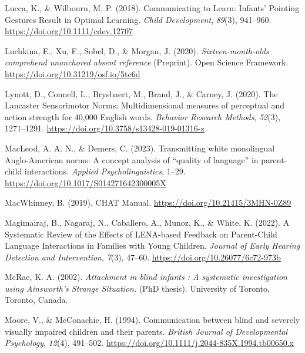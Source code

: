 \documentclass[
  man,floatsintext]{apa6}
\newlength{\cslhangindent}
\newlength{\cslentryspacingunit} %
\newenvironment{CSLReferences}[2] %
 {%
  \setlength{\parindent}{0pt}
  \ifodd #1
  \let\oldpar\par
  \def\par{\hangindent=\cslhangindent\oldpar}
  \fi
  \setlength{\parskip}{#2\cslentryspacingunit}
 }%
 {}
\begin{document}
\begin{CSLReferences}{1}{0}
\leavevmode{}%
Lucca, K., \& Wilbourn, M. P. (2018). Communicating to {Learn}: {Infants}' {Pointing Gestures Result} in {Optimal Learning}. \emph{Child Development}, \emph{89}(3), 941--960. \url{https://doi.org/10.1111/cdev.12707}

\leavevmode{}%
Luchkina, E., Xu, F., Sobel, D., \& Morgan, J. (2020). \emph{Sixteen-month-olds comprehend unanchored absent reference} (Preprint). {Open Science Framework}. \url{https://doi.org/10.31219/osf.io/5tc6d}

\leavevmode{}%
Lynott, D., Connell, L., Brysbaert, M., Brand, J., \& Carney, J. (2020). The {Lancaster Sensorimotor Norms}: Multidimensional measures of perceptual and action strength for 40,000 {English} words. \emph{Behavior Research Methods}, \emph{52}(3), 1271--1291. \url{https://doi.org/10.3758/s13428-019-01316-z}

\leavevmode{}%
MacLeod, A. A. N., \& Demers, C. (2023). Transmitting white monolingual {Anglo-American} norms: {A} concept analysis of {``quality of language''} in parent-child interactions. \emph{Applied Psycholinguistics}, 1--29. \url{https://doi.org/10.1017/S014271642300005X}

\leavevmode{}%
MacWhinney, B. (2019). {CHAT Manual}. \url{https://doi.org/10.21415/3MHN-0Z89}

\leavevmode{}%
Magimairaj, B., Nagaraj, N., Caballero, A., Munoz, K., \& White, K. (2022). A {Systematic Review} of the {Effects} of {LENA-based Feedback} on {Parent-Child Language Interactions} in {Families} with {Young Children}. \emph{Journal of Early Hearing Detection and Intervention}, \emph{7}(3), 47--60. \url{https://doi.org/10.26077/6c72-973b}

\leavevmode{}%
McRae, K. A. (2002). \emph{Attachment in blind infants : A systematic investigation using {Ainsworth}'s {Strange Situation}.} (PhD thesis). University of Toronto, {Toronto, Canada}.

\leavevmode{}%
Moore, V., \& McConachie, H. (1994). Communication between blind and severely visually impaired children and their parents. \emph{British Journal of Developmental Psychology}, \emph{12}(4), 491--502. \url{https://doi.org/10.1111/j.2044-835X.1994.tb00650.x}


\end{CSLReferences}
\end{document}
